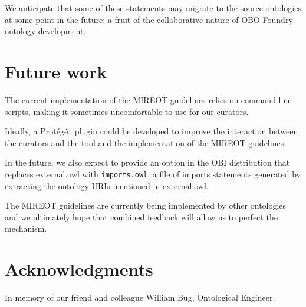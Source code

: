 \documentclass[a4paper,10pt,twocolumn]{article}
\newcommand{\protege}{Prot\'{e}g\'{e}}
\begin{document}
We anticipate that some of these statements may migrate to the source ontologies at some point in the future; a fruit of the collaborative nature of OBO Foundry ontology development. 


\section*{Future work}
The current implementation of the \ac{MIREOT} guidelines relies on command-line scripts, making it sometimes uncomfortable to use for our curators.

Ideally, a \protege\ \cite{RefWorks:1501} plugin could be developed to improve the interaction between the curators and the tool and the implementation of the MIREOT guidelines.

In the future, we also expect to provide an option in the OBI distribution that replaces \texttt{}{external.owl} with \texttt{imports.owl}, a file of imports statements generated by extracting the ontology URIs mentioned in \texttt{}{external.owl}.

The MIREOT guidelines are currently being implemented by other ontologies and we ultimately hope that combined feedback will allow us to perfect the mechanism.

\section*{Acknowledgments}

In memory of our friend and colleague William Bug, Ontological Engineer. 
\end{document}
